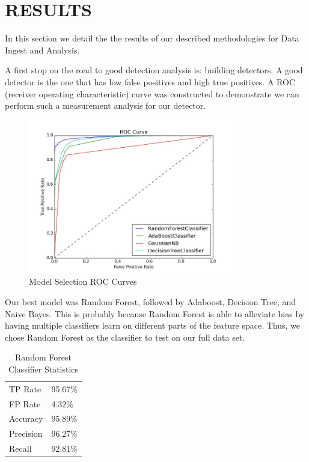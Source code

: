 \documentclass{acm_proc_article-sp}
\begin{document}
\section{RESULTS}
In this section we detail the the results of our described methodologies for Data Ingest and Analysis.

A first stop on the road to good detection analysis is: building detectors. A good detector is the one that has low false positives and high true positives. A ROC (receiver operating characteristic) curve was constructed to demonstrate we can perform such a measurement analysis for our detector.

\begin{figure}[ht!]
\centering
\includegraphics[width=90mm]{images/20160417_new_and_improved_ROC_jpeg.jpg}
\caption{Model Selection ROC Curves \label{overflow}}
\end{figure}

Our best model was Random Forest, followed by Adaboost, Decision Tree, and Naive Bayes. This is probably because Random Forest is able to alleviate bias by having multiple classifiers learn on different parts of the feature space. Thus, we chose Random Forest as the classifier to test on our full data set.



\begin{table}[h]
\centering
\begin{tabular}{ |p{3.5cm}||p{2cm}|  }
 \hline
 TP Rate& 95.67\%\\
 FP Rate& 4.32\%\\
 Accuracy & 95.89\%\\
 Precision & 96.27\%\\
 Recall& 92.81\%\\
\hline
\end{tabular}
\vspace{2mm}
\caption{Random Forest Classifier Statistics}
\label{table:2}
\end{table}
\end{document}
